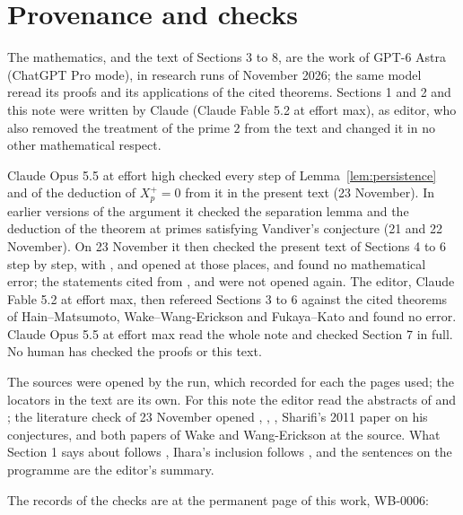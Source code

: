 \documentclass[11pt]{article}
\theoremstyle{definition}
\numberwithin{equation}{section}
\begin{document}
\section*{Provenance and checks}

The mathematics, and the text of Sections 3 to 8, are the work of GPT-6 Astra (ChatGPT Pro mode), in research
runs of November 2026; the same model reread its proofs and its applications of the cited theorems. Sections 1
and 2 and this note were written by Claude (Claude Fable 5.2 at effort max), as editor, who also removed the
treatment of the prime $2$ from the text and changed it in no other mathematical respect.

Claude Opus 5.5 at effort high checked every step of Lemma~\ref{lem:persistence} and of the deduction of
$X_p^+=0$ from it in the present text (23 November). In earlier versions of the argument it checked the
separation lemma and the deduction of the theorem at primes satisfying Vandiver's conjecture (21 and 22
November). On 23 November it then checked the present text of Sections 4 to 6 step by step, with
\cite[Proposition~2.2.6]{WakeWangErickson2017}, \cite[Corollary~2.1.3, Conjecture~2.1.5 and
Corollary~8.1.3(2)]{WakeWangEricksonPseudo2018} and \cite[\S6.1.5 and \S\S7.1.9--7.1.10]{FukayaKato2012} opened at
those places, and found no mathematical error; the statements cited from \cite{MilneLEC2013},
\cite{SharifiIwasawaNotes} and \cite{Iwasawa1981} were not opened again. The editor, Claude Fable 5.2 at effort max, then refereed
Sections 3 to 6 against the cited theorems of Hain--Matsumoto, Wake--Wang-Erickson and Fukaya--Kato and found no error. Claude Opus 5.5 at effort max read the whole note and checked Section 7 in full. No human has checked the proofs or this text.

The sources were opened by the run, which recorded for each the pages used; the locators in the text are its
own. For this note the editor read the abstracts of \cite{Sharifi2002} and \cite{IshiiKernel2026}; the literature
check of 23 November opened \cite{Sharifi2002}, \cite{Sharifi2019}, \cite{IshiiKernel2026}, Sharifi's 2011
paper on his conjectures, \cite{FukayaKato2012} and both papers of Wake and Wang-Erickson at the source. What
Section 1 says about \cite{AndersonIhara1988} follows \cite[p.~2]{IshiiKernel2026}, Ihara's inclusion follows
\cite[p.~1]{Sharifi2002}, and the sentences on the programme are the editor's summary.

The records of the checks are at the permanent page of this work, WB-0006:
\end{document}
